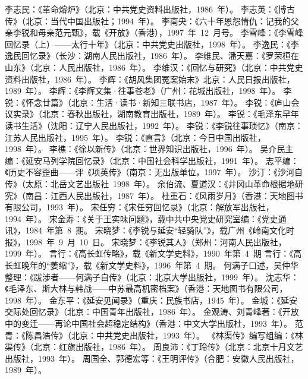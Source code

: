 \begin{thebibliography}{999}
\bibitem{}李志民：《革命熔炉》（北京：中共党史资料出版社，1986~年）。
\bibitem{}李志英：《博古传》（北京：当代中国出版社；1994~年）。
\bibitem{}李南央：《六十年恩怨情仇：记我的父亲李锐和母亲范元甄》，载《开放》（香港），1997~年~12~月号。
\bibitem{}李雪峰：《李雪峰回忆录（上）——太行十年》（北京：中共党史出版社，1998~年）。
\bibitem{}李逸民：《李逸民回忆录》（长沙：湖南人民出版社，1986~年）。
\bibitem{}李维民、潘天嘉：《罗荣桓在山东》（北京：人民出版社，1986~年）。
\bibitem{}李维汉：《回忆与研究》（北京：中共党史资料出版社，1986~年）。
\bibitem{}李辉：《胡风集团冤案始末》北京：人民日报出版社，1989~年）。
\bibitem{}李辉：《李辉文集·往事苍老》（广州：花城出版社，1998~年）。
\bibitem{}李锐：《怀念廿篇》（北京：生活·读书·新知三联书店，1987~年）。
\bibitem{}李锐：《庐山会议实录》（北京：春秋出版社，湖南教育出版社，1989~年）。
\bibitem{}李锐：《毛泽东早年读书生活》（沈阳：辽宁人民出版社，1992~年）。
\bibitem{}李锐：《李锐往事琐忆》（南京：江苏人民出版社，1995~年）。
\bibitem{}李锐：《直言》（北京：今日中国出版社，1998~年）。
\bibitem{}李樵：《徐以新传》（北京：世界知识出版社，1996~年）。
\bibitem{}吴介民主编：《延安马列学院回忆录》（北京：中国社会科学出版社，1991~年）。
\bibitem{}志平编：《历史不容歪曲——评《项英传》（南京：无出版单位，1997~年）。
\bibitem{}沙汀：《沙河自传》（太原：北岳文艺出版社~1998~年）。
\bibitem{}余伯流、夏道汉：《井冈山革命根据地研究》（南昌：江西人民出版社，1987~年）。
\bibitem{}杜重石：《风雨岁月》（香港：天地图书有限公司，1993~年）。
\bibitem{}宋任穷：《宋任穷回忆录》（北京：解放军出版社，1994~年）。
\bibitem{}宋金寿：《关于王实味问题》，载中共中央党史研究室编：《党史通讯》，1984~年第~8~期。
\bibitem{}宋晓梦：《李锐与延安“轻骑队”》，载广州《岭南文化时报》，1998~年~9~月~10~日。
\bibitem{}宋晓梦：《李锐其人》（郑州：河南人民出版社，1999~年）。
\bibitem{}言行：《高长虹传略》，载《新文学史料》，1990~年第~4~期
\bibitem{}言行：《高长虹晚年的“萎缩”》，载《新文学史料》，1996~年第~4~期。
\bibitem{}何满子口述，吴仲华整理：《跋涉者——何满子自传》（北京：北京大学出版社，1999~年）。
\bibitem{}沈志华：《毛泽东、斯大林与韩战——中苏最高机密档案》（香港：天地图书有限公司，1998~年）。
\bibitem{}金东平：《延安见闻录》（重庆：民族书店，1945~年）。
\bibitem{}金城：《延安交际处回忆录》（北京：中国青年出版社，1986~年）。
\bibitem{}金观涛、刘青峰著：《开放中的变迁——再论中国社会超稳定结构》（香港：中文大学出版杜，1993~年）。
\bibitem{}范青：《陈昌浩传》（北京：中共党史出版社，1993~年）。
\bibitem{}《林渠传》编写组编：《林渠传》（北京：红旗出版社，1986~年）。
\bibitem{}周良沛：《丁玲传》（北京：北京十月文艺出版社，1993~年）。
\bibitem{}周国全、郭德宏等：《王明评传》（合肥：安徽人民出版社，1989~年）。

\end{thebibliography}
